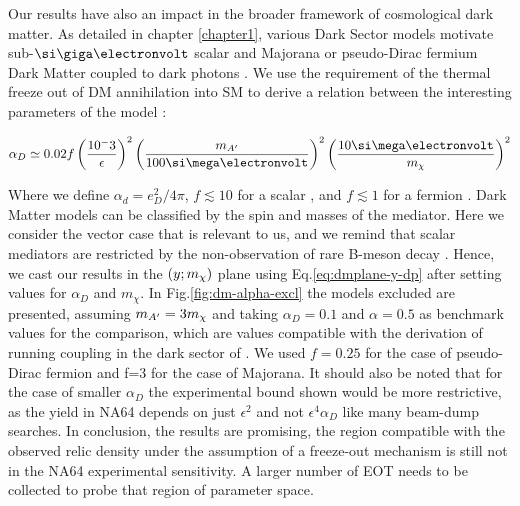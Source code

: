 Our results have also an impact in the broader framework of cosmological dark matter. As detailed in chapter \ref{chapter1}, various Dark Sector models motivate sub-$\gev$ scalar and Majorana or pseudo-Dirac fermium Dark Matter coupled to dark photons \cite{battaglieri2017cosmic}. We use the requirement of the thermal freeze out of DM annihilation into SM to derive a relation between the interesting parameters of the model \cite{na64-prd}:

\begin{equation}
  \label{eq:ad-freeze-out}
  \alpha_D \simeq 0.02 f\left(\frac{10^-3}{\epsilon}\right)^2\left(\frac{m_{\DM}}{100 \mev}\right)^2\left(\frac{10 \mev}{m_{\chi}}\right)^2
\end{equation}

Where we define $\alpha_d = e^2_D/4\pi$, $f\lesssim 10$ for a scalar \cite{deNiverville:2011it}, and $f\lesssim 1$ for a fermion \cite{PhysRevD.91.094026}. Dark Matter models can be classified by the spin and masses of the mediator. Here we consider the vector case that is relevant to us, and we remind that scalar mediators are restricted by the non-observation of rare B-meson decay \cite{battaglieri2017cosmic}. Hence, we cast our results in the $(y;m_{\chi})$ plane using Eq.\ref{eq:dmplane-y-dp} after setting values for $\alpha_D$ and $m_{\chi}$. In Fig.\ref{fig:dm-alpha-excl} the models excluded are presented, assuming $m_{A'} = 3m_{\chi}$ and taking $\alpha_D=0.1$ and $\alpha=0.5$ as benchmark values for the comparison, which are values compatible with the derivation of running coupling in the dark sector of \cite{Davoudiasl:2015hxa}. We used $f=0.25$ for the case of pseudo-Dirac fermion and f=3 for the case of Majorana. It should also be noted that for the case of smaller $\alpha_D$ the experimental bound shown would be more restrictive, as the yield in NA64 depends on just $\epsilon^2$ and not $\epsilon^4 \alpha_D$ like many beam-dump searches. In conclusion, the results are promising, the region compatible with the observed relic density under the assumption of a freeze-out mechanism is still not in the NA64 experimental sensitivity. A larger number of EOT needs to be collected to probe that region of parameter space.

